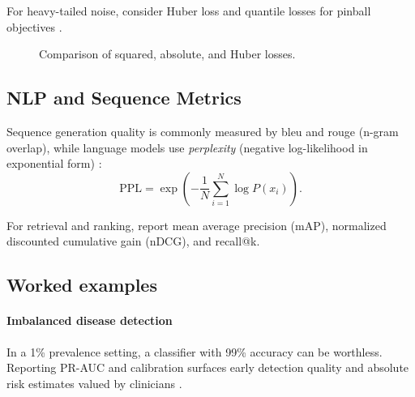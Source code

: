 For heavy-tailed noise, consider Huber loss and quantile losses for pinball objectives \textcite{Prince2023}.

\begin{figure}[h]
  \centering
  \caption{Comparison of squared, absolute, and Huber losses.}
  \label{fig:huber}
\end{figure}

\subsection{NLP and Sequence Metrics}

Sequence generation quality is commonly measured by \gls{bleu}  and \gls{rouge}  (n-gram overlap), while language models use \emph{perplexity} (negative log-likelihood in exponential form) \textcite{GoodfellowEtAl2016,D2LChapterRNN}:
\begin{equation}
\text{PPL} = \exp\left(-\frac{1}{N} \sum_{i=1}^{N} \log P(x_i)\right).
\end{equation}

For retrieval and ranking, report mean average precision (mAP), normalized discounted cumulative gain (nDCG), and recall@k.

\subsection{Worked examples}

\paragraph{Imbalanced disease detection} In a 1\% prevalence setting, a classifier with 99\% accuracy can be worthless. Reporting PR-AUC and calibration surfaces early detection quality and absolute risk estimates valued by clinicians \textcite{Ronneberger2015}.

